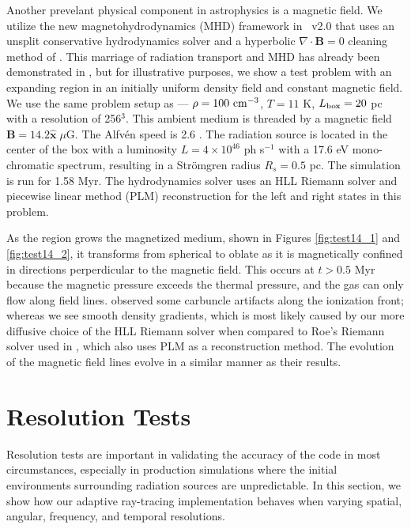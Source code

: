 \documentclass[12pt,preprint]{aastex}
\begin{document}
Another prevelant physical component in astrophysics is a magnetic
field.  We utilize the new magnetohydrodynamics (MHD) framework
\citep{Wang09} in \enzo~v2.0 that uses an unsplit conservative
hydrodynamics solver and a hyperbolic $\nabla \cdot \mathbf{B} = 0$
cleaning method of \citet{Dedner02}.  This marriage of radiation
transport and MHD has already been demonstrated in \citet{Wang10}, but
for illustrative purposes, we show a test problem with an expanding
 region in an initially uniform density field and constant
magnetic field.  We use the same problem setup as
\citet{Krumholz07_ART} --- $\rho = 100~\cubecm$, $T = 11$ K, $L_{\rm
  box} = 20$ pc with a resolution of 256$^3$.  This ambient medium is
threaded by a magnetic field $\mathbf{B} = 14.2 \hat{\mathbf{x}} \;
\mu\mathrm{G}$.  The Alfv\'{e}n speed is 2.6 \kms.  The radiation
source is located in the center of the box with a luminosity $L = 4
\times 10^{46}$ ph s$^{-1}$ with a 17.6 eV mono-chromatic spectrum,
resulting in a Str\"{o}mgren radius $R_s = 0.5$ pc.  The simulation is
run for 1.58 Myr.  The hydrodynamics solver uses an HLL Riemann solver
\citep{HLL} and piecewise linear method (PLM) reconstruction
\citep{PLM} for the left and right states in this problem.

As the  region grows the magnetized medium, shown in Figures
\ref{fig:test14_1} and \ref{fig:test14_2}, it transforms from
spherical to oblate as it is magnetically confined in directions
perperdicular to the magnetic field.  This occurs at $t > 0.5$ Myr
because the magnetic pressure exceeds the thermal pressure, and the
gas can only flow along field lines.  \citeauthor{Krumholz07_ART}
observed some carbuncle artifacts along the ionization front; whereas
we see smooth density gradients, which is most likely caused by our
more diffusive choice of the HLL Riemann solver when compared to Roe's
Riemann solver used in \citet{Krumholz07_ART}, which also uses PLM as
a reconstruction method.  The evolution of the magnetic field lines
evolve in a similar manner as their results.

\section{Resolution Tests}

Resolution tests are important in validating the accuracy of the code
in most circumstances, especially in production simulations where the
initial environments surrounding radiation sources are unpredictable.
In this section, we show how our adaptive ray-tracing implementation
behaves when varying spatial, angular, frequency, and temporal
resolutions.
\end{document}
